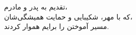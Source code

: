 \begin{acknowledgementpage}
\vspace{2.5cm}
\begin{center}
{\nastaliq
تقدیم به پدر و مادرم،\\[0.8cm]
که با مهر، شکیبایی و حمایت همیشگی‌شان،\\[0.8cm]
مسیر آموختن را برایم هموار کردند.
}
\end{center}
\end{acknowledgementpage}
\newpage
